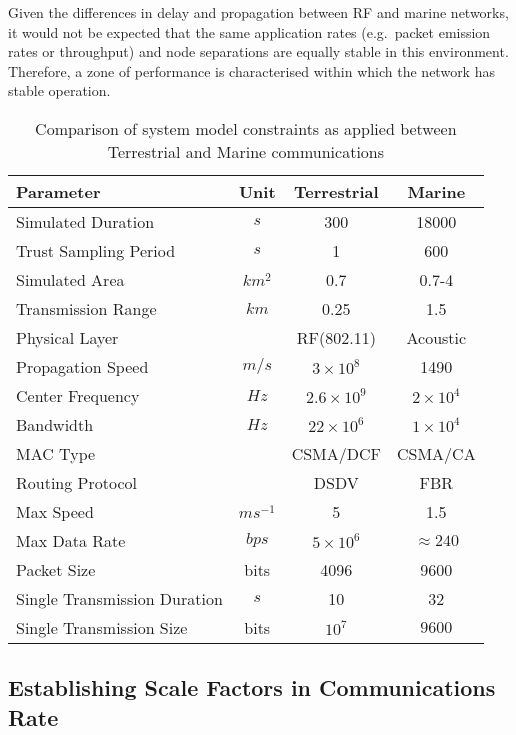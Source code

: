 Given the differences in delay and propagation between RF and marine networks, it would not be expected that the same application rates (e.g.\ packet emission rates or throughput) and node separations are equally stable in this environment.
Therefore, a zone of performance is characterised within which the network has stable operation.
%
\begin{table}[h]
	\caption{Comparison of system model constraints as applied between Terrestrial and Marine communications} \label{tab:sysconstraints}
	\begin{center}
		\setlength{\tabcolsep}{8pt}
		\begin{tabular}{lccc}
			\toprule
			Parameter & Unit & Terrestrial & Marine \\
			\midrule
			Simulated Duration & $s$ & 300 & 18000\\
			Trust Sampling Period & $s$ & 1 & 600 \\
			Simulated Area & $km^2$ & 0.7 & 0.7-4 \\
			Transmission Range & $km$ & 0.25 & 1.5 \\
			Physical Layer & & RF(802.11) & Acoustic\\
			Propagation Speed& $m/s$ & $3\times10^8$ & 1490\\
			Center Frequency& $Hz$ & $2.6\times10^9$ & $2 \times 10^4$ \\
			Bandwidth& $Hz$ & $22\times10^6$ & $1\times10^4$\\
			MAC Type & & CSMA/DCF & CSMA/CA\\
			Routing Protocol & & DSDV & FBR \\
			Max Speed & $ms^{-1}$ & 5 & 1.5 \\
			Max Data Rate & $bps$ & $5\times10^6$ & $\approx 240$ \\
			Packet Size & bits & 4096 &  9600 \\
			Single Transmission Duration & $s$ & 10 & 32 \\
			Single Transmission Size & bits & $10^7$ & $9600$ \\
			\bottomrule
		\end{tabular}
		\setlength{\tabcolsep}{6pt}
	\end{center}
\end{table}
%


\subsection{Establishing Scale Factors in Communications Rate}

